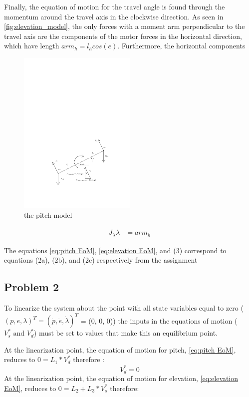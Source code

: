 Finally, the equation of motion for the travel angle is found through
the momentum around the travel axis in the  clockwise direction. As
seen in \cref{fig:elevation_model}, the only forces with a moment arm
perpendicular to the travel axis are the components of the motor
forces in the horizontal direction, which have length $arm_h =
l_hcos(e)$. Furthermore, the horizontal components


\begin{figure}[H]
  \caption{the pitch model}
  \label{fig:pitch_model}
  \includegraphics[width=0.5\textwidth]{images/pitch_model}
\end{figure}

\begin{align*}
\label{eq:lambda EoM}
  J_\lambda\ddot{\lambda} &= arm_h
\end{align*}

The equations \cref{eq:pitch EoM}, \ref{eq:elevation EoM}, and (3) correspond to equations (2a), (2b), and (2c) respectively from the assignment \cite[p.13]{assignment}

\subsection{Problem 2}
To linearize the system about the point with all state variables equal
to zero ($(p, e, \lambda)^T = (\dot{p},\dot{e},\dot{\lambda})^T $ = (0, 0, 0))
the inputs in the equations of motion ($V^{*}_{s} \text{ and } V^{*}_{d}$) must be set to
values that make this an equilibrium point.

At the linearization point, the equation of motion for pitch,
\cref{eq:pitch EoM}, reduces to $0 = L_{1} *
V^{*}_{d}$ therefore
:
\begin{equation}
\label{eq:V^*_d value}
  V^{*}_{d} = 0
\end{equation}
At the linearization point, the equation of motion for elevation,
\cref{eq:elevation EoM}, reduces to $0 = L_{2} +
L_{3}*V^{*}_{s}$ therefore:

